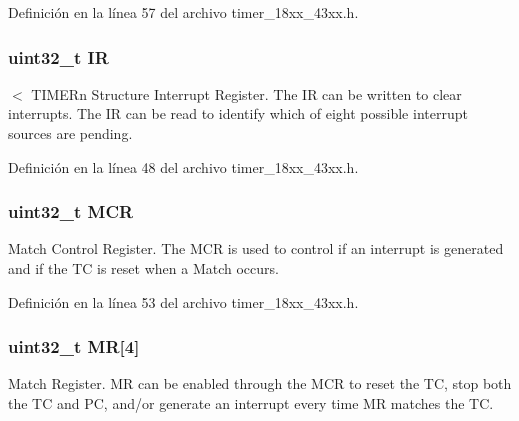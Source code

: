 Definición en la línea 57 del archivo timer\+\_\+18xx\+\_\+43xx.\+h.

\subsubsection[{\texorpdfstring{IR}{IR}}]{ uint32\+\_\+t IR}\hypertarget{struct_l_p_c___t_i_m_e_r___t_a6615bc39cfcd7131bdc8662583cc6714}{}\label{struct_l_p_c___t_i_m_e_r___t_a6615bc39cfcd7131bdc8662583cc6714}
$<$ T\+I\+M\+E\+Rn Structure Interrupt Register. The IR can be written to clear interrupts. The IR can be read to identify which of eight possible interrupt sources are pending. 

Definición en la línea 48 del archivo timer\+\_\+18xx\+\_\+43xx.\+h.

\subsubsection[{\texorpdfstring{M\+CR}{MCR}}]{ uint32\+\_\+t M\+CR}\hypertarget{struct_l_p_c___t_i_m_e_r___t_a27af4e9f888f0b7b1e8da7e002d98798}{}\label{struct_l_p_c___t_i_m_e_r___t_a27af4e9f888f0b7b1e8da7e002d98798}
Match Control Register. The M\+CR is used to control if an interrupt is generated and if the TC is reset when a Match occurs. 

Definición en la línea 53 del archivo timer\+\_\+18xx\+\_\+43xx.\+h.

\subsubsection[{\texorpdfstring{MR}{MR}}]{ uint32\+\_\+t MR\mbox{[}4\mbox{]}}\hypertarget{struct_l_p_c___t_i_m_e_r___t_a3cf8dd14680194ee82a55d1cf9dd299c}{}\label{struct_l_p_c___t_i_m_e_r___t_a3cf8dd14680194ee82a55d1cf9dd299c}
Match Register. MR can be enabled through the M\+CR to reset the TC, stop both the TC and PC, and/or generate an interrupt every time MR matches the TC. 

